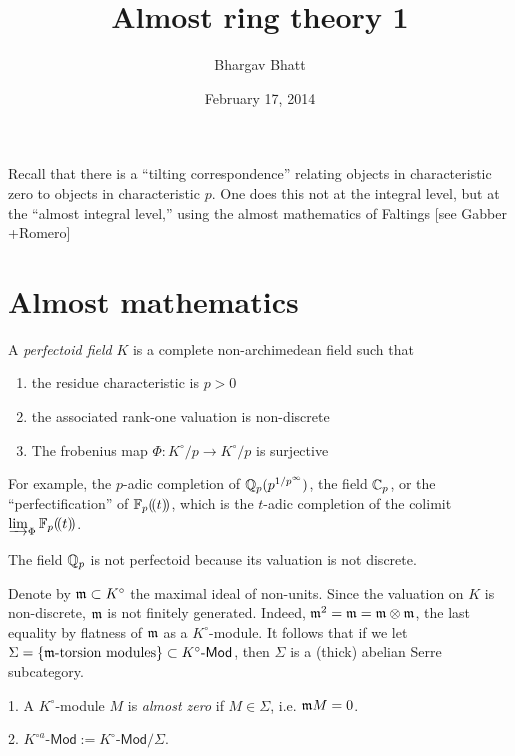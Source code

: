 \documentclass{article}
\title{Almost ring theory 1}
\author{Bhargav Bhatt}
\date{February 17, 2014}
\begin{document}
\maketitle





Recall that there is a ``tilting correspondence'' relating objects in characteristic 
zero to objects in characteristic $p$. One does this not at the integral level, 
but at the ``almost integral level,'' using the almost mathematics of Faltings
[see Gabber +Romero]




\section{Almost mathematics}


\begin{definition}
A \emph{perfectoid field} $K$ is a complete non-archimedean field such that 
\begin{enumerate}
  \item the residue characteristic is $p>0$
  \item the associated rank-one valuation is non-discrete
  \item The frobenius map $\Phi:K^\circ/p \to K^\circ/p$ is surjective 
\end{enumerate}
\end{definition}

For example, the $p$-adic completion of $\mathbb{Q}_p(p^{1/p^\infty})$, the field 
$\mathbb{C}_p$, or the ``perfectification'' of $\mathbb{F}_p(\!( {t} )\!)$, which is the 
$t$-adic completion of the colimit $\varinjlim_\Phi \mathbb{F}_p(\!( {t} )\!)$. 

The field $\mathbb{Q}_p$ is not perfectoid because its valuation is not discrete. 

Denote by $\mathfrak{m}\subset K^\circ$ the maximal ideal of non-units. Since the valuation 
on $K$ is non-discrete, $\mathfrak{m}$ is not finitely generated. Indeed, 
$\mathfrak{m}^2=\mathfrak{m} = \mathfrak{m}\otimes \mathfrak{m}$, the last equality by flatness of $\mathfrak{m}$ as a 
$K^\circ$-module. It follows that if we let $\Sigma=\{\mathfrak{m}\text{-torsion modules}\}\subset K^\circ\text{-}\mathsf{Mod}$, then $\Sigma$ is a (thick) abelian Serre subcategory. 

\begin{definition}
1. A $K^\circ$-module $M$ is \emph{almost zero} if $M\in\Sigma$, i.e. $\mathfrak{m} M=0$. 

2. $K^{\circ a}\text{-}\mathsf{Mod}:= K^\circ\text{-}\mathsf{Mod} / \Sigma$. 
\end{definition}
\end{document}
